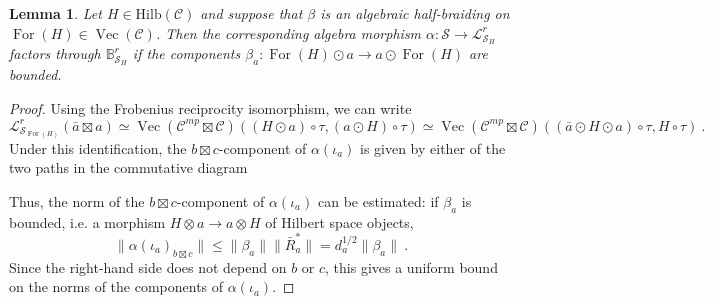 \documentclass[a4paper,11pt,reqno]{amsart}
\numberwithin{equation}{section}
\newtheorem{lemma}[theorem]{Lemma}
\theoremstyle{remark}
\theoremstyle{definition}
\newcommand{\bB}{\mathbb B}
\newcommand{\cC}{\mathcal C}
\newcommand{\cL}{\mathcal L}
\newcommand{\cS}{\mathcal S}
\DeclareMathOperator{\Vect}{Vec}
\DeclareMathOperator{\For}{For}
\newcommand{\id}{\mathrm{id}}
\newcommand{\Hilb}{\mathrm{Hilb}}
\begin{document}
\begin{lemma}
	Let $H \in \Hilb(\cC)$ and suppose that $\beta$ is an algebraic half-braiding on $\For(H) \in \Vect(\cC)$. Then the corresponding algebra morphism $\alpha: \cS \to \cL^r_{\cS_H}$ factors through $\bB^r_{\cS_H}$ if the components $\beta_a: \For(H) \odot a \to a \odot \For(H)$ are bounded.
	\label{lemma:fromboundedhalfbraidingstoboundedalgebramorphism}
	\end{lemma}
	\begin{proof}
		Using the Frobenius reciprocity isomorphism, we can write
		\[
		\cL^r_{\cS_{\For(H)}} (\bar{a} \boxtimes a) \simeq \Vect(\cC^{mp} \boxtimes \cC) ((H \odot a) \circ \tau , (a \odot H) \circ \tau) \simeq \Vect(\cC^{mp} \boxtimes \cC)((\bar{a} \odot H \odot a) \circ \tau, H \circ \tau) \ .
		\]
		Under this identification, the $ b \boxtimes c$-component of $\alpha(\iota_a)$ is given by either of the two paths in the commutative diagram
		\begin{center}
		\end{center}
		Thus, the norm of the $b \boxtimes c$-component of $\alpha(\iota_a)$ can be estimated: if $\beta_a$ is bounded, i.e. a morphism $H \otimes a \to a \otimes H$ of Hilbert space objects, 
		\[
		\| \alpha(\iota_a)_{b \boxtimes c} \| \leq \| \beta_a \| \| \bar{R}_a^* \| = d_a^{1/2} \| \beta_a\| \ .
		\]
		Since the right-hand side does not depend on $b$ or $c$, this gives a uniform bound on the norms of the components of $\alpha(\iota_a)$.
	\end{proof}
\end{document}
